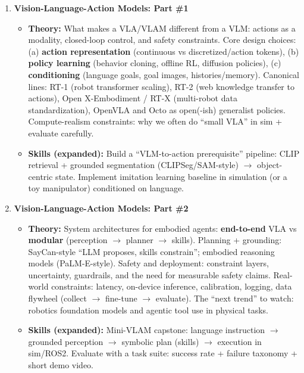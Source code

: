 \documentclass[a4paper,11pt]{texMemo}
\begin{document}
\begin{enumerate}
\item \textbf{Vision-Language-Action Models: Part \#1}
\citep{rt1_2022, rt2_2023, openx_2023, openvla_2024, octo_2024, diffusionpolicy2023}
\begin{itemize}
    \item \textbf{Theory:}
    What makes a VLA/VLAM different from a VLM: actions as a modality, closed-loop control, and safety constraints.
    Core design choices:
    (a) \textbf{action representation} (continuous vs discretized/action tokens),
    (b) \textbf{policy learning} (behavior cloning, offline RL, diffusion policies),
    (c) \textbf{conditioning} (language goals, goal images, histories/memory).
    Canonical lines:
    RT-1 (robot transformer scaling),
    RT-2 (web knowledge transfer to actions),
    Open X-Embodiment / RT-X (multi-robot data standardization),
    OpenVLA and Octo as open(-ish) generalist policies.
    Compute-realism constraints: why we often do ``small VLA'' in sim + evaluate carefully.
    \item \textbf{Skills (expanded):}
    Build a ``VLM-to-action prerequisite'' pipeline:
    CLIP retrieval + grounded segmentation (CLIPSeg/SAM-style) $\rightarrow$ object-centric state.
    Implement imitation learning baseline in simulation (or a toy manipulator) conditioned on language.
\end{itemize}

\item \textbf{Vision-Language-Action Models: Part \#2}
\citep{saycan_2022, palme_2023, gemini_robotics_2025}
\begin{itemize}
    \item \textbf{Theory:}
    System architectures for embodied agents:
    \textbf{end-to-end} VLA vs \textbf{modular} (perception $\rightarrow$ planner $\rightarrow$ skills).
    Planning + grounding: SayCan-style ``LLM proposes, skills constrain''; embodied reasoning models (PaLM-E-style).
    Safety and deployment: constraint layers, uncertainty, guardrails, and the need for measurable safety claims.
    Real-world constraints: latency, on-device inference, calibration, logging, data flywheel (collect $\rightarrow$ fine-tune $\rightarrow$ evaluate).
    The ``next trend'' to watch: robotics foundation models and agentic tool use in physical tasks.
    \item \textbf{Skills (expanded):}
    Mini-VLAM capstone:
    language instruction $\rightarrow$ grounded perception $\rightarrow$ symbolic plan (skills) $\rightarrow$ execution in sim/ROS2.
    Evaluate with a task suite: success rate + failure taxonomy + short demo video.
\end{itemize}


\end{enumerate}
\end{document}
